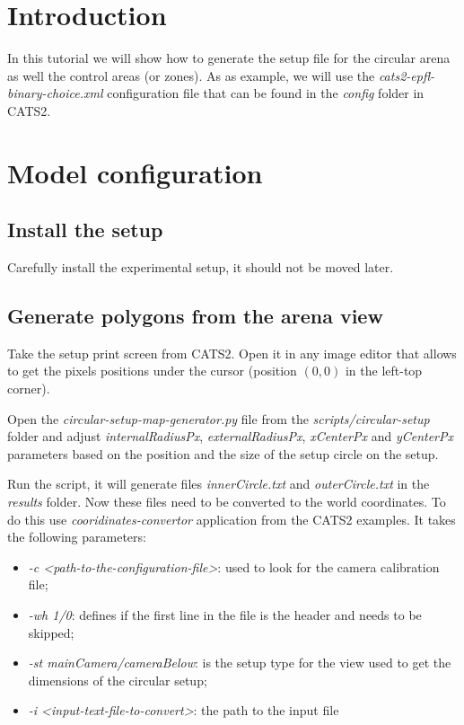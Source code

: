 \documentclass{styles/assisi}
\begin{document}

\lstset{
    language=xml,
    tabsize=3,
    xleftmargin=20pt,
    framexleftmargin=15pt,
    numbers=left,
    numberstyle=\tiny,
    numbersep=5pt,
    breaklines=true,
    showstringspaces=false,
    basicstyle=\footnotesize}

\chapter{Introduction}\label{chap:intro}
In this tutorial we will show how to generate the setup file for the circular arena as well the control areas (or zones). As as example, we will use the {\it cats2-epfl-binary-choice.xml} configuration file that can be found in the {\it config} folder in CATS2.

\chapter{Model configuration}\label{chap:intro}
\section{Install the setup}
Carefully install the experimental setup, it should not be moved later. 

\section{Generate polygons from the arena view}
Take the setup print screen from CATS2. Open it in any image editor that allows to get the pixels positions under the cursor (position $(0,0)$ in the left-top corner). 

Open the {\it circular-setup-map-generator.py} file from the {\it scripts/circular-setup} folder and adjust {\it internalRadiusPx}, {\it externalRadiusPx}, {\it xCenterPx} and {\it yCenterPx} parameters based on the position and the size of the setup circle on the setup. 

Run the script, it will generate files {\it innerCircle.txt} and {\it outerCircle.txt} in the {\it results} folder. Now these files need to be converted to the world coordinates. To do this use {\it cooridinates-convertor} application from the CATS2 examples. It takes the following parameters: 
\begin{itemize}
\item {\it -c  <path-to-the-configuration-file>}: used to look for the camera calibration file;
\item {\it -wh 1/0}: defines if the first line in the file is the header and needs to be skipped;
\item {\it -st mainCamera/cameraBelow}: is the setup type for the view used to get the dimensions of the circular setup;
\item {\it -i <input-text-file-to-convert>}: the path to the input file
\end{itemize}
\end{document}
